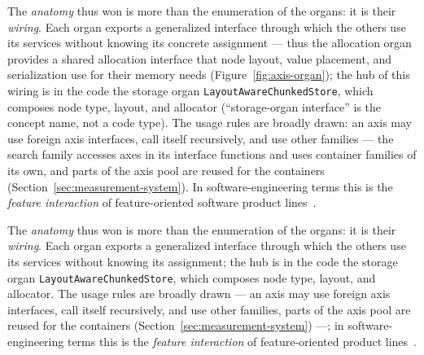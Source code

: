 \begin{nurlang}
The \emph{anatomy} thus won is more than the enumeration of the organs: it is their \emph{wiring}.
Each organ exports a generalized interface through which the others use its services without
knowing its concrete assignment --- thus the allocation organ provides a shared
allocation interface that node layout, value placement, and serialization use for their
memory needs (Figure~\ref{fig:axis-organ}); the hub of this wiring is in the code
the storage organ \texttt{LayoutAwareChunkedStore}, which composes node type, layout, and allocator
(\enquote{storage-organ interface} is the concept name, not a code type). The usage rules are broadly
drawn: an axis may use foreign axis interfaces, call itself recursively, and use other
families --- the search family accesses axes in its interface functions and uses
container families of its own, and parts of the axis pool are reused for the containers
(Section~\ref{sec:measurement-system}). In software-engineering terms this is the \emph{feature interaction}
of feature-oriented software product lines~\cite{apel2013feature,batory1992hierarchical}.
\end{nurlang}
\begin{nurkurz}
The \emph{anatomy} thus won is more than the enumeration of the organs: it is their \emph{wiring}. Each
organ exports a generalized interface through which the others use its services without knowing its
assignment; the hub is in the code the storage organ \texttt{LayoutAwareChunkedStore}, which composes node
type, layout, and allocator. The usage rules are broadly drawn --- an axis may use foreign axis
interfaces, call itself recursively, and use other families, parts of the axis pool are reused for the
containers (Section~\ref{sec:measurement-system}) ---; in software-engineering terms this is the
\emph{feature interaction} of feature-oriented product lines~\cite{apel2013feature,batory1992hierarchical}.
\end{nurkurz}

